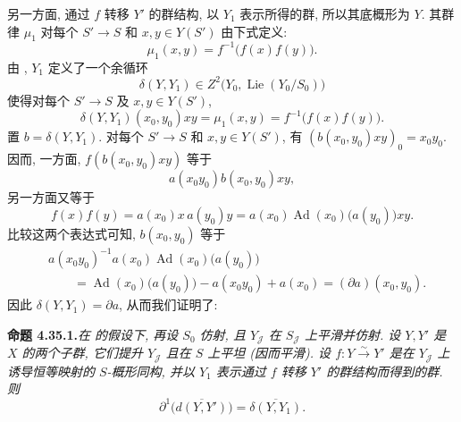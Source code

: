 另一方面, 通过 \(f\) 转移 \(Y'\) 的群结构, 以 \(Y_1\) 表示所得的群,
所以其底概形为 \(Y\). 其群律 \(\mu_1\) 对每个 \(S'\to S\) 和
\(x,y\in Y(S')\) 由下式定义:
\[
 \mu_1(x,y)=f^{-1}\bigl(f(x)f(y)\bigr).
\]
由 , \(Y_1\) 定义了一个余循环
\[
 \delta(Y,Y_1)\in
 Z^2\bigl(Y_0,\operatorname{Lie}(Y_0/S_0)\bigr)
\]
使得对每个 \(S'\to S\) 及 \(x,y\in Y(S')\),
\[
 \delta(Y,Y_1)(x_0,y_0)xy
 =\mu_1(x,y)=f^{-1}\bigl(f(x)f(y)\bigr).
\]
置 \(b=\delta(Y,Y_1)\). 对每个 \(S'\to S\) 和 \(x,y\in Y(S')\),
有 \((b(x_0,y_0)xy)_0=x_0y_0\). 因而, 一方面,
\(f(b(x_0,y_0)xy)\) 等于
\[
 a(x_0y_0)b(x_0,y_0)xy,
\]
另一方面又等于
\[
 f(x)f(y)=a(x_0)x\,a(y_0)y
 =a(x_0)\operatorname{Ad}(x_0)\bigl(a(y_0)\bigr)xy.
\]
比较这两个表达式可知, \(b(x_0,y_0)\) 等于
\[
 \begin{aligned}
 &a(x_0y_0)^{-1}a(x_0)
   \operatorname{Ad}(x_0)\bigl(a(y_0)\bigr)\\
 &\qquad={}
 \operatorname{Ad}(x_0)\bigl(a(y_0)\bigr)-a(x_0y_0)+a(x_0)
 =(\partial a)(x_0,y_0).
 \end{aligned}
\]
因此 \(\delta(Y,Y_1)=\partial a\), 从而我们证明了:

\medskip
\noindent{}\textbf{命题 4.35.1.}\footnotemark[132]
\textit{在  的假设下,
再设 \(S_0\) 仿射, 且 \(Y_{\mathscr J}\) 在 \(S_{\mathscr J}\) 上平滑并仿射.
设 \(Y,Y'\) 是 \(X\) 的两个子群, 它们提升 \(Y_{\mathscr J}\) 且在 \(S\)
上平坦 (因而平滑). 设 \(f:Y\xrightarrow{\sim}Y'\) 是在
\(Y_{\mathscr J}\) 上诱导恒等映射的 \(S\)-概形同构,
并以 \(Y_1\) 表示通过 \(f\) 转移 \(Y'\) 的群结构而得到的群. 则}
\[
 \partial^1\bigl(\overline{d(Y,Y')}\bigr)
 =\overline{\delta(Y,Y_1)}.
\]

